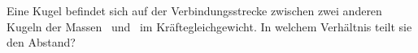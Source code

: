 Eine Kugel befindet sich auf der Verbindungsstrecke zwischen zwei anderen Kugeln der Massen \mEiO\ und \mZwO\ im Kräftegleichgewicht. In welchem Verhältnis teilt sie den Abstand?
